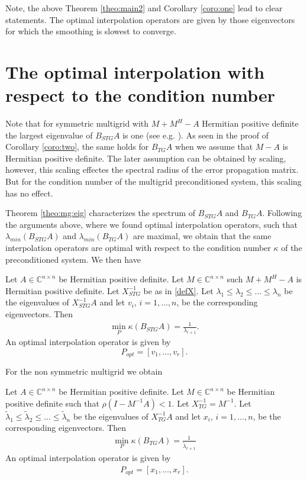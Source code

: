 \documentclass[final]{siamltex}
\newcommand{\beqo}{\begin{eqnarray*}}
\newcommand{\beq}{\begin{eqnarray}}
\newcommand{\eeqo}{\end{eqnarray*}}
\newcommand{\eeq}{\end{eqnarray}}
\numberwithin{equation}{section}
\newcommand{\inCnn}{\in \mathbb{C}^{n \times n}}
\begin{document}
Note, the above Theorem \ref{theo:main2} and  Corollary \ref{coro:one} lead to clear statements. The optimal interpolation operators are given by those  eigenvectors for which the smoothing is slowest to converge. 







\section{The optimal interpolation with respect to the  condition number}





Note  that for symmetric multigrid with  $M + M^H - A$ Hermitian  positive definite  the largest eigenvalue of 
$B_{STG}A$ is one (see e.g. \cite{Not15}).  As seen in the proof of Corollary \ref{coro:two}, the same holds  for  $B_{TG}A$ when we assume  that  $M - A$ is Hermitian  positive definite. The later
assumption can be obtained  by scaling, however, this scaling effectes the spectral radius of the
error propagation matrix. But for the condition number of the multigrid preconditioned system, this scaling has no effect.

Theorem \ref{theo:mg:eig} characterizes the  spectrum of $B_{STG}A$ and $B_{TG}A$. Following the arguments above, where   we found optimal interpolation operators, such that
$\lambda_{min}(B_{STG}A)$ and $\lambda_{min}(B_{TG}A)$ are maximal, we obtain that the same interpolation operators are optimal with respect to the condition number $\kappa$ of the preconditioned system. We then have

 \begin{theorem}
Let  $A\inCnn$  be Hermitian positive definite. Let $ M \inCnn$ such $M + M^H - A$ is Hermitian positive definite. 
Let $X_{STG}^{-1}$  be as in \eqref{defX}.  
 Let $
\lambda_1 \leq \lambda_2 \leq \ldots \leq  \lambda_n $
be the  eigenvalues of $X_{STG}^{-1}A$  and let $v_i$, $i = 1, \ldots, n$, be the corresponding eigenvectors. Then 
\beq
\min_P \kappa(B_{STG}A) = \frac{1}{\lambda_{r+1}}.
\eeq
An optimal interpolation operator is given by 
\[
P_{opt} = [v_{1}, \ldots , v_r].
\]
\end{theorem}
  
For the non symmetric multigrid we obtain

\begin{theorem}
Let  $A\inCnn$  be Hermitian positive definite. Let $ M \inCnn$ be Hermitian positive definite  such that $\rho(I - M^{-1}A) < 1.$ 
Let $X_{TG}^{-1} =  M^{-1}$.   
 Let $
\tilde \lambda_1 \leq \tilde \lambda_2 \leq \ldots \leq  \tilde \lambda_n $
be the  eigenvalues of $X_{TG}^{-1}A$  and let $x_i$, $i = 1, \ldots, n$, be the corresponding eigenvectors. Then 
\beqo
\min_P \kappa(B_{TG}A) = \frac{1}{\tilde \lambda_{r+1}}
\eeqo
An optimal interpolation operator is given by 
\beqo
P_{opt} = [x_{1}, \ldots , x_r].
\eeqo
\end{theorem}
\end{document}
